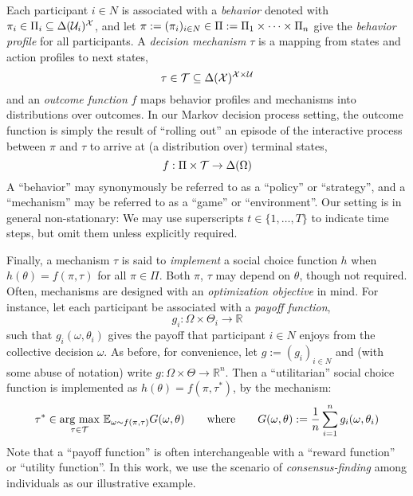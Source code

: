 \begin{redefinition}[restate=defmechanism,name=Decision Mechanism]\upshape\label{def:mechanism}
%
Each participant $i\in N$ is associated with a \textit{behavior} denoted with $\pi_{i}\in\Pi_{i}\subseteq\Delta(\mathcal{U}_{i})^{\mathcal{X}}$,
and let $\pi:=(\pi_{i})_{i\in N}\in\Pi:=\Pi_{1}\times\dots\times\Pi_{n}$ give the \textit{behavior profile} for all participants.
%
A \textit{decision mechanism} $\tau$ is a mapping from states and action profiles to next states,
%
\begin{equation}
\tau\in\mathcal{T}\subseteq\Delta(\mathcal{X})^{\mathcal{X}\times\mathcal{U}}
\end{equation}
%
and an \textit{outcome function} $f$ maps behavior profiles and mechanisms into distributions over outcomes.
%
In our Markov decision process setting,
the outcome function is simply the result of ``rolling out'' an episode of the interactive process between $\pi$ and $\tau$ to arrive at (a distribution over) terminal states,
%
\begin{equation}
f:\Pi\times\mathcal{T}\rightarrow\Delta(\Omega)
\end{equation}
%
A ``behavior'' may synonymously be referred to as a ``policy'' or ``strategy'',
%
and a ``mechanism'' may be referred to as a ``game'' or ``environment''.
%
Our setting is in general non-stationary: We may use superscripts $t\in\{1,\dots,T\}$ to indicate time steps, but omit them unless explicitly required.
%
\EOD
\end{redefinition}

Finally,
a mechanism $\tau$ is said to \textit{implement} a social choice function $h$ when $h(\theta)=f(\pi, \tau)$
for all $\pi\in\Pi$.
%
Both $\pi$, $\tau$ may depend on $\theta$, though not required.
%
Often,
mechanisms are designed with an \textit{optimization objective} in mind.
%
For instance,
let each participant be associated with a \textit{payoff function},
%
\begin{equation}
g_{i}:\Omega\times\Theta_{i}\rightarrow\mathbb{R}
\end{equation}
%
such that $g_{i}(\omega,\theta_{i})$ gives the payoff that participant $i\in N$ enjoys from the collective decision $\omega$.
%
As before, for convenience, let $g:=(g_{i})_{i\in N}$ and (with some abuse of notation) write $g:\Omega\times\Theta\rightarrow\mathbb{R}^{n}$.
%
Then a ``utilitarian'' social choice function is implemented as
$h(\theta)=f(\pi, \tau^{*})$,
%
by the mechanism:
%
\begin{equation}
\tau^{*}
\in
\underset{\tau\in\mathcal{T}}{\text{arg~max}}~
\mathbb{E}_{\omega\sim f(\pi,\tau)}
G(\omega,\theta)
\qquad
\text{where}
\qquad
G(\omega,\theta)
:=
\frac{1}{n}
\sum_{i=1}^{n}g_{i}(\omega,\theta_{i})
\label{eqn:utilitarian}
\end{equation}
%
%
Note that a ``payoff function'' is often interchangeable with a ``reward function'' or ``utility function''.
%
In this work, we use the scenario of \textit{consensus-finding} among individuals as our illustrative example.

